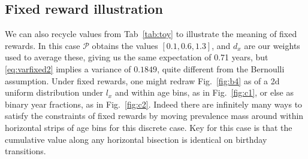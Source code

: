 \documentclass[a4paper]{article}
\begin{document}
\subsection{Fixed reward illustration}
We can also recycle values from Tab~\ref{tab:toy} to illustrate the meaning of fixed rewards. In this case $\mathcal{P}$ obtains the values $[0.1,0.6,1.3]$, and $d_x$ are our weights used to average these, giving us the same expectation of 0.71 years, but \eqref{eq:varfixed2} implies a variance of $0.1849$, quite different from the Bernoulli assumption. Under fixed rewards, one might redraw Fig.~\ref{fig:b4} as of a 2d uniform distribution under $l_x$ and within age bins, as in Fig.~\ref{fig:c1}, or else as binary year fractions, as in Fig.~\ref{fig:c2}. Indeed there are infinitely many ways to satisfy the constraints of fixed rewards by moving prevalence mass around within horizontal strips of age bins for this discrete case. Key for this case is that the cumulative value along any horizontal bisection is identical on birthday transitions.
\end{document}
